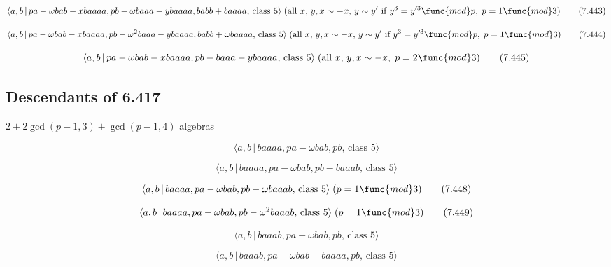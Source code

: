 \documentclass[10pt]{article}
\begin{document}
\begin{equation}
\langle a,b\,|\,pa-\omega bab-xbaaaa,pb-\omega baaa-ybaaaa,babb+baaaa,\,%
\text{class }5\rangle \;(\text{all }x,\,y,x\sim -x,\,y\sim y^{\prime}\text{
if }y^3=y^{\prime 3}\func{mod}p,\;p=1\func{mod}3)  \tag{7.443}
\end{equation}

\begin{equation}
\langle a,b\,|\,pa-\omega bab-xbaaaa,pb-\omega ^{2}baaa-ybaaaa,babb+\omega
baaaa,\,\text{class }5\rangle \;(\text{all }x,\,y,x\sim -x,\,y\sim y^{\prime}%
\text{ if }y^3=y^{\prime 3}\func{mod}p,\;p=1\func{mod}3)  \tag{7.444}
\end{equation}

\begin{equation}
\langle a,b\,|\,pa-\omega bab-xbaaaa,pb-baaa-ybaaaa,\,\text{class }5\rangle
\;(\text{all }x,\,y,x\sim -x,\;p=2\func{mod}3)  \tag{7.445}
\end{equation}

\subsection{Descendants of 6.417}

$2+2\gcd (p-1,3)+\gcd (p-1,4)$ algebras

\begin{equation}
\langle a,b\,|\,baaaa,pa-\omega bab,pb,\,\text{class }5\rangle  \tag{7.446}
\end{equation}

\begin{equation}
\langle a,b\,|\,baaaa,pa-\omega bab,pb-baaab,\,\text{class }5\rangle 
\tag{7.447}
\end{equation}

\begin{equation}
\langle a,b\,|\,baaaa,pa-\omega bab,pb-\omega baaab,\,\text{class }5\rangle
\;(p=1\func{mod}3)  \tag{7.448}
\end{equation}

\begin{equation}
\langle a,b\,|\,baaaa,pa-\omega bab,pb-\omega ^{2}baaab,\,\text{class }%
5\rangle \;(p=1\func{mod}3)  \tag{7.449}
\end{equation}

\begin{equation}
\langle a,b\,|\,baaab,pa-\omega bab,pb,\,\text{class }5\rangle  \tag{7.450}
\end{equation}

\begin{equation}
\langle a,b\,|\,baaab,pa-\omega bab-baaaa,pb,\,\text{class }5\rangle 
\tag{7.451}
\end{equation}
\end{document}
